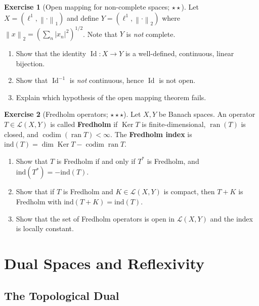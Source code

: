 \documentclass[a4paper,12pt]{book}
\DeclareMathOperator{\Id}{Id}
\DeclareMathOperator{\Ker}{Ker}
\DeclareMathOperator{\codim}{codim}
\DeclareMathOperator{\ran}{ran}
\newcommand{\norm}[1]{\left\| #1 \right\|}
\newcommand{\abs}[1]{\left| #1 \right|}
\theoremstyle{definition}
\newtheorem{exercise}{Exercise}[chapter]
\theoremstyle{plain}
\theoremstyle{remark}
\begin{document}
\begin{exercise}[Open mapping for non-complete spaces; $\star\star$]%
\label{ex:omt-counterexample}
Let $X = (\ell^1, \norm{\cdot}_1)$ and define $Y = (\ell^1, \norm{\cdot}_2)$
where $\norm{x}_2 = \left(\sum_n \abs{x_n}^2\right)^{1/2}$. Note that $Y$ is
\emph{not} complete.
\begin{enumerate}[label=(\alph*)]
  \item Show that the identity $\Id \colon X \to Y$ is a well-defined, continuous,
    linear bijection.
  \item Show that $\Id^{-1}$ is \emph{not} continuous, hence $\Id$ is not open.
  \item Explain which hypothesis of the open mapping theorem fails.
\end{enumerate}
\end{exercise}

\begin{exercise}[Fredholm operators; $\star\star\star$]\label{ex:fredholm}
Let $X, Y$ be Banach spaces. An operator $T \in \mathcal{L}(X,Y)$ is called
\textbf{Fredholm} if $\Ker T$ is finite-dimensional, $\ran(T)$ is closed, and
$\codim(\ran T) < \infty$. The \textbf{Fredholm index} is
$\mathrm{ind}(T) = \dim \Ker T - \codim \ran T$.
\begin{enumerate}[label=(\alph*)]
  \item Show that $T$ is Fredholm if and only if $T^*$ is Fredholm, and
    $\mathrm{ind}(T^*) = -\mathrm{ind}(T)$.
  \item Show that if $T$ is Fredholm and $K \in \mathcal{L}(X,Y)$ is compact, then
    $T + K$ is Fredholm with $\mathrm{ind}(T+K) = \mathrm{ind}(T)$.
  \item Show that the set of Fredholm operators is open in $\mathcal{L}(X,Y)$
    and the index is locally constant.
\end{enumerate}
\end{exercise}
\chapter{Dual Spaces and Reflexivity}\label{ch:dual-reflexivity}
\minitoc

\section{The Topological Dual}\label{sec:topological-dual}
\end{document}
